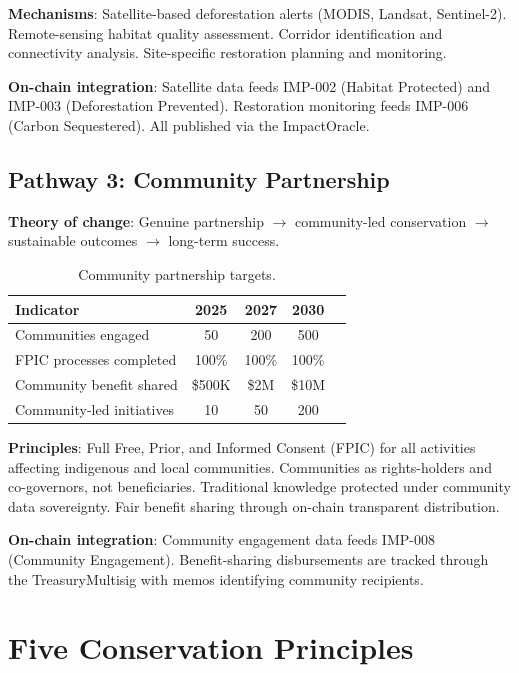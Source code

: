 \documentclass[11pt,letterpaper]{article}
\begin{document}
\textbf{Mechanisms}: Satellite-based deforestation alerts (MODIS, Landsat, Sentinel-2). Remote-sensing habitat quality assessment. Corridor identification and connectivity analysis. Site-specific restoration planning and monitoring.

\textbf{On-chain integration}: Satellite data feeds IMP-002 (Habitat Protected) and IMP-003 (Deforestation Prevented). Restoration monitoring feeds IMP-006 (Carbon Sequestered). All published via the ImpactOracle.

\subsection{Pathway 3: Community Partnership}

\textbf{Theory of change}: Genuine partnership $\to$ community-led conservation $\to$ sustainable outcomes $\to$ long-term success.

\begin{table}[t]
\centering
\begin{tabular}{lcccc}
\toprule
\textbf{Indicator} & \textbf{2025} & \textbf{2027} & \textbf{2030} \\
\midrule
Communities engaged & 50 & 200 & 500 \\
FPIC processes completed & 100\% & 100\% & 100\% \\
Community benefit shared & \$500K & \$2M & \$10M \\
Community-led initiatives & 10 & 50 & 200 \\
\bottomrule
\end{tabular}
\caption{Community partnership targets.}
\label{tab:community}
\end{table}

\textbf{Principles}: Full Free, Prior, and Informed Consent (FPIC) for all activities affecting indigenous and local communities. Communities as rights-holders and co-governors, not beneficiaries. Traditional knowledge protected under community data sovereignty. Fair benefit sharing through on-chain transparent distribution.

\textbf{On-chain integration}: Community engagement data feeds IMP-008 (Community Engagement). Benefit-sharing disbursements are tracked through the TreasuryMultisig with memos identifying community recipients.

\section{Five Conservation Principles}
\end{document}
